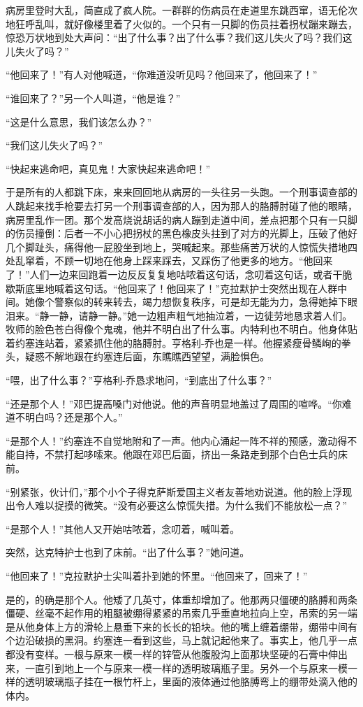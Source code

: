     病房里登时大乱，简直成了疯人院。一群群的伤病员在走道里东跳西窜，语无伦次地狂呼乱叫，就好像楼里着了火似的。一个只有一只脚的伤员拄着拐杖蹦来蹦去，惊恐万状地到处大声问：“出了什么事？出了什么事？我们这儿失火了吗？我们这儿失火了吗？”

    “他回来了！”有人对他喊道，“你难道没听见吗？他回来了，他回来了！”

    “谁回来了？”另一个人叫道，“他是谁？”

    “这是什么意思，我们该怎么办？”

    “我们这儿失火了吗？”

    “快起来逃命吧，真见鬼！大家快起来逃命吧！”

    于是所有的人都跳下床，来来回回地从病房的一头往另一头跑。一个刑事调查部的人跳起来找手枪要去打另一个刑事调查部的人，因为那人的胳膊肘碰了他的眼睛，病房里乱作一团。那个发高烧说胡话的病人蹦到走道中间，差点把那个只有一只脚的伤员撞倒：后者一不小心把拐杖的黑色橡皮头拄到了对方的光脚上，压破了他好几个脚趾头，痛得他一屁股坐到地上，哭喊起来。那些痛苦万状的人惊慌失措地四处乱窜着，不顾一切地在他身上踩来踩去，又踩伤了他更多的地方。“他回来了！”人们一边来回跑着一边反反复复地咕哝着这句话，念叨着这句话，或者干脆歇斯底里地喊着这句话。“他回来了！他回来了！”克拉默护士突然出现在人群中间。她像个警察似的转来转去，竭力想恢复秩序，可是却无能为力，急得她掉下眼泪来。“静一静，请静一静。”她一边粗声粗气地抽泣着，一边徒劳地恳求着人们。牧师的脸色苍白得像个鬼魂，他并不明白出了什么事。内特利也不明白。他身体贴着约塞连站着，紧紧抓住他的胳膊肘。亨格利-乔也是一样。他握紧瘦骨鳞峋的拳头，疑惑不解地跟在约塞连后面，东瞧瞧西望望，满脸惧色。

    “喂，出了什么事？”亨格利-乔恳求地问，“到底出了什么事？”

    “还是那个人！”邓巴提高嗓门对他说。他的声音明显地盖过了周围的喧哗。“你难道不明白吗？还是那个人。”

    “是那个人！”约塞连不自觉地附和了一声。他内心涌起一阵不祥的预感，激动得不能自持，不禁打起哆嗦来。他跟在邓巴后面，挤出一条路走到那个白色士兵的床前。

    “别紧张，伙计们，”那个小个子得克萨斯爱国主义者友善地劝说道。他的脸上浮现出令人难以捉摸的微笑。“没有必要这么惊慌失措。为什么我们不能放松一点？”

    “是那个人！”其他人又开始咕哝着，念叨着，喊叫着。

    突然，达克特护士也到了床前。“出了什么事？”她问道。

    “他回来了！”克拉默护士尖叫着扑到她的怀里。“他回来了，回来了！”

    是的，的确是那个人。他矮了几英寸，体重却增加了。他那两只僵硬的胳膊和两条僵硬、丝毫不起作用的粗腿被绷得紧紧的吊索几乎垂直地拉向上空，吊索的另一端是从他身体上方的滑轮上悬垂下来的长长的铅块。他的嘴上缠着绷带，绷带中间有个边沿破损的黑洞。约塞连一看到这些，马上就记起他来了。事实上，他几乎一点都没有变样。一根与原来一模一样的锌管从他腹股沟上面那块坚硬的石膏中伸出来，一直引到地上一个与原来一模一样的透明玻璃瓶子里。另外一个与原来一模一样的透明玻璃瓶子挂在一根竹杆上，里面的液体通过他胳膊弯上的绷带处滴入他的体内。

